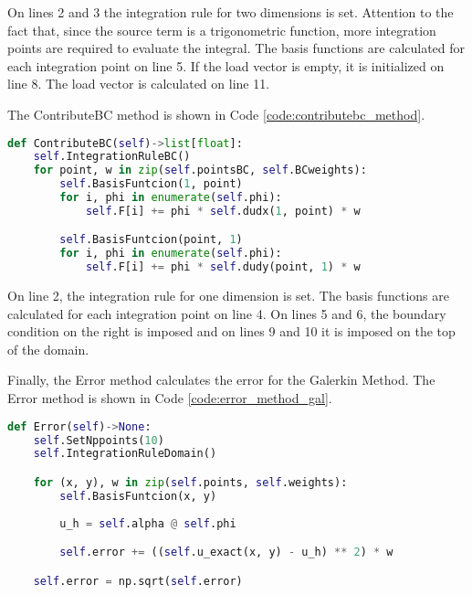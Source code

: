 On lines 2 and 3 the integration rule for two dimensions is set. Attention to the fact that, since the source term is a trigonometric function, more integration points are required to evaluate the integral. The basis functions are calculated for each integration point on line 5. If the load vector is empty, it is initialized on line 8. The load vector is calculated on line 11.

The ContributeBC method is shown in Code \ref{code:contributebc_method}.
\begin{lstlisting}[caption={ContributeBC method},label={code:contributebc_method},language=python]
def ContributeBC(self)->list[float]:
    self.IntegrationRuleBC()
    for point, w in zip(self.pointsBC, self.BCweights):
        self.BasisFuntcion(1, point)
        for i, phi in enumerate(self.phi):
            self.F[i] += phi * self.dudx(1, point) * w

        self.BasisFuntcion(point, 1)
        for i, phi in enumerate(self.phi):
            self.F[i] += phi * self.dudy(point, 1) * w
\end{lstlisting}

On line 2, the integration rule for one dimension is set. The basis functions are calculated for each integration point on line 4. On lines 5 and 6, the boundary condition on the right is imposed and on lines 9 and 10 it is imposed on the top of the domain. 

Finally, the Error method calculates the error for the Galerkin Method. The Error method is shown in Code \ref{code:error_method_gal}.
\begin{lstlisting}[caption={Error method},label={code:error_method_gal},language=python]
def Error(self)->None:
    self.SetNppoints(10)
    self.IntegrationRuleDomain()

    for (x, y), w in zip(self.points, self.weights):
        self.BasisFuntcion(x, y)
            
        u_h = self.alpha @ self.phi

        self.error += ((self.u_exact(x, y) - u_h) ** 2) * w 

    self.error = np.sqrt(self.error)
\end{lstlisting}

